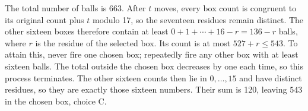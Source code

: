 The total number of balls is 663. After $t$ moves, every box count is congruent to its original count plus $t$ modulo 17, so the seventeen residues remain distinct. The other sixteen boxes therefore contain at least $0+1+\cdots+16-r=136-r$ balls, where $r$ is the residue of the selected box. Its count is at most $527+r\le543$. To attain this, never fire one chosen box; repeatedly fire any other box with at least sixteen balls. The total outside the chosen box decreases by one each time, so this process terminates. The other sixteen counts then lie in $0,\ldots,15$ and have distinct residues, so they are exactly those sixteen numbers. Their sum is 120, leaving $\boxed{543}$ in the chosen box, choice C.
